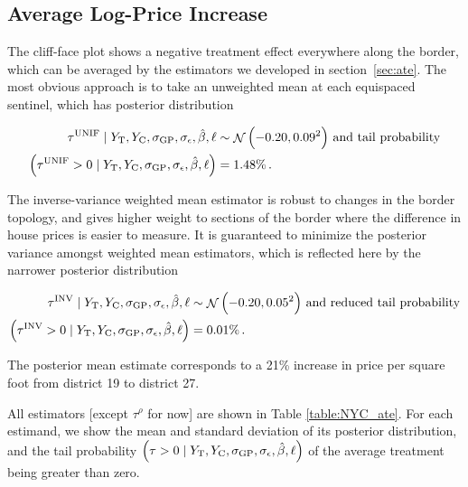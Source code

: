 \documentclass[letter]{article}
\let\Pr\relax
\DeclareMathOperator{\Pr}{\mathbb{P}}
\DeclareMathOperator{\normal}{\mathcal{N}}
\newcommand{\treat}{\mathrm{T}}
\newcommand{\ctrol}{\mathrm{C}}
\newcommand{\sigmaf}{\sigma_{\mathrm{GP}}}
\newcommand{\sigman}{\sigma_{\epsilon}}
\newcommand{\unifavg}{\tau^{\mathrm{UNIF}}}
\newcommand{\invvar}{\tau^{\mathrm{INV}}}
\newcommand{\taurho}{\tau^{\rho}}
\begin{document}
    	\subsection{Average Log-Price Increase}\label{average-log-price-increase}

The cliff-face plot shows a negative treatment effect everywhere along the border, which can be averaged by the estimators we developed in section~\ref{sec:ate}. The most obvious approach is to take an unweighted mean at each equispaced sentinel, which has posterior distribution

\begin{equation}
\begin{split}
    \unifavg \mid Y_\treat{}, Y_\ctrol{}, \sigmaf, \sigman, \hat{\beta}, \ell &\sim \normal\del{-0.20, 0.09^2}\,\text{and tail probability} \\
    \Pr\del{\unifavg > 0 \mid Y_\treat{}, Y_\ctrol{}, \sigmaf, \sigman, \hat{\beta}, \ell} &= 1.48\% \,.
\end{split}
\end{equation}

The inverse-variance weighted mean estimator is robust to changes in the border topology, and gives higher weight to sections of the border where the difference in house prices is easier to measure. It is guaranteed to minimize the posterior variance amongst weighted mean estimators, which is reflected here by the narrower posterior distribution

\begin{equation}
\begin{split}
    \invvar \mid Y_\treat{}, Y_\ctrol{}, \sigmaf, \sigman, \hat{\beta}, \ell &\sim \normal\del{-0.20, 0.05^2}\,\text{and reduced tail probability} \\
    \Pr\del{\invvar > 0 \mid Y_\treat{}, Y_\ctrol{}, \sigmaf, \sigman, \hat{\beta}, \ell} &= 0.01\% \,.
\end{split}
\end{equation}

The posterior mean estimate corresponds to a 21\% increase in price per square foot from district 19 to district 27.

All estimators {[}except \(\taurho\) for now{]} are shown in Table \ref{table:NYC_ate}. For each estimand, we show the mean and standard deviation of its posterior distribution, and the tail probability \(\Pr\del{\tau > 0 \mid Y_\treat{}, Y_\ctrol{}, \sigmaf, \sigman, \hat{\beta}, \ell}\) of the average treatment being greater than zero.
    
\end{document}
